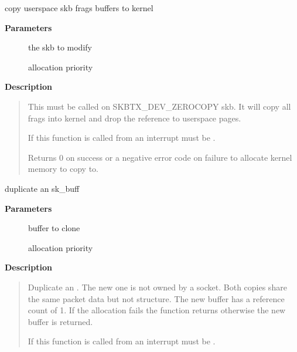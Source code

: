 \documentclass[a4paper,8pt,english]{sphinxmanual}
\begin{document}
\begin{fulllineitems}
\label{networking/kapi:c.skb_copy_ubufs}
copy userspace skb frags buffers to kernel

\end{fulllineitems}


\textbf{Parameters}
\begin{description}
\item[{}] \leavevmode
the skb to modify

\item[{}] \leavevmode
allocation priority

\end{description}

\textbf{Description}
\begin{quote}

This must be called on SKBTX\_DEV\_ZEROCOPY skb.
It will copy all frags into kernel and drop the reference
to userspace pages.

If this function is called from an interrupt  must be
.

Returns 0 on success or a negative error code on failure
to allocate kernel memory to copy to.
\end{quote}

\begin{fulllineitems}
\label{networking/kapi:c.skb_clone}
duplicate an sk\_buff

\end{fulllineitems}


\textbf{Parameters}
\begin{description}
\item[{}] \leavevmode
buffer to clone

\item[{}] \leavevmode
allocation priority

\end{description}

\textbf{Description}
\begin{quote}

Duplicate an {\hyperref[networking/kapi:c.sk_buff]{\emph{}}}. The new one is not owned by a socket. Both
copies share the same packet data but not structure. The new
buffer has a reference count of 1. If the allocation fails the
function returns  otherwise the new buffer is returned.

If this function is called from an interrupt  must be
.
\end{quote}
\end{document}

